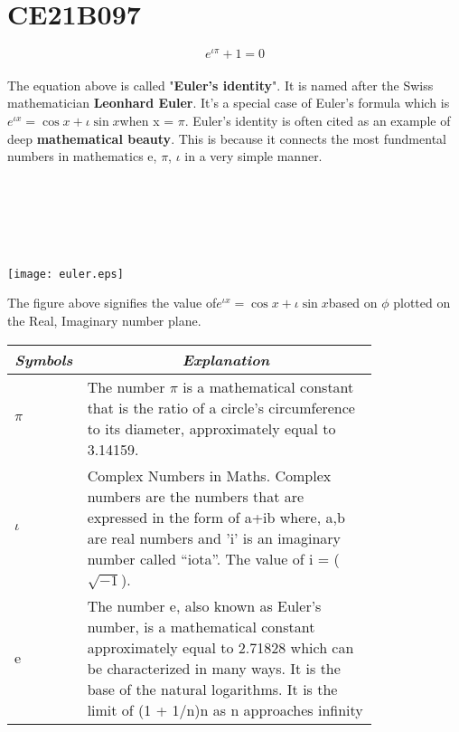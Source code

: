 \section{CE21B097}
\begin{equation}
    \boxed{e^{\iota\pi}+1=0}
\end{equation}
\\The equation above is called "\textbf{Euler's identity}". It is named after the Swiss mathematician \textbf{Leonhard Euler}. It's a special case of Euler's formula which is\quad$e^{\iota x}= \cos{x} + \iota\sin{x}$\quad when x = $\pi$. Euler's identity is often cited as an example of deep \textbf{mathematical beauty}. This is because it connects the most fundmental numbers in mathematics e, $\pi$, $\iota$ in a very simple manner. \\ \\ \\ \\ \\ \\
\begin{center} \texttt{[image: euler.eps]}
\end{center}
The figure above signifies the value of\quad$e^{\iota x}= \cos{x} + \iota\sin{x}$\quad based on $\phi$ plotted on the Real, Imaginary number plane.  
\begin{table}[htbp]
\centering
\begin{tabular}{|l|p{0.8\linewidth}|}
\hline
\multicolumn{1}{|c|}{\textit{\textbf{Symbols}}} & \multicolumn{1}{c|}{\textit{\textbf{Explanation}}}                                                   \tabularnewline \hline
$\pi$                                              &    The number $\pi$ is a mathematical constant that is the ratio of a circle's circumference to its diameter, approximately equal to 3.14159.                                            \tabularnewline \hline
$\iota$                                             &   Complex Numbers in Maths. Complex numbers are the numbers that are expressed in the form of a+ib where, a,b are real numbers and 'i' is an imaginary number called “iota”. The value of i = ($\sqrt{-1}$).                                                                            \tabularnewline \hline
e                                           &        The number e, also known as Euler's number, is a mathematical constant approximately equal to 2.71828 which can be characterized in many ways. It is the base of the natural logarithms. It is the limit of (1 + 1/n)n as n approaches infinity                                                        \tabularnewline \hline
\end{tabular}
\end{table}
